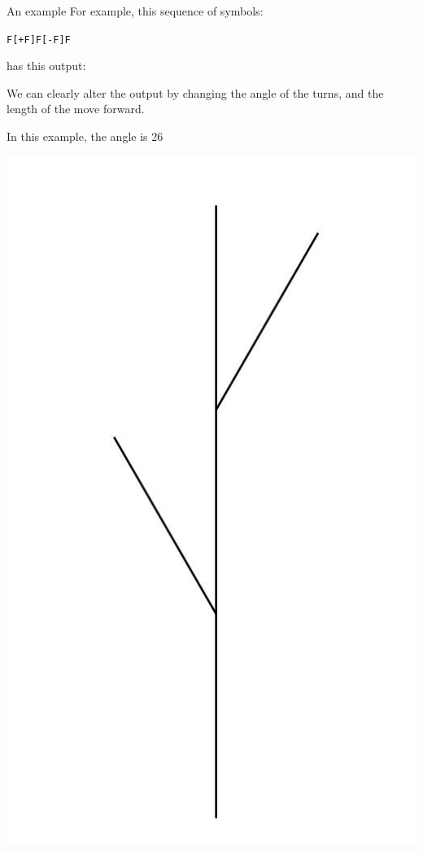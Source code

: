 \documentclass[bigger]{beamer}
\begin{document}
\begin{frame}[fragile,label={sec:org8d0f32d}]{An example}
 For example, this sequence of symbols:

\texttt{F[+F]F[-F]F} 


has this output: 

We can clearly alter the output by changing the angle of the turns, 
and the length of the move forward.

In this example, the angle is 26\textdegree{}

\begin{center}
\includegraphics[width=.9\linewidth]{./l_tree1.jpg}
\end{center}
\end{frame}
\end{document}
